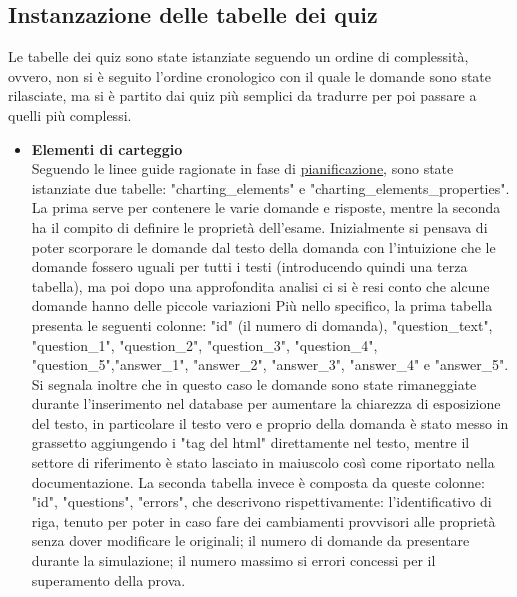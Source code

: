 \subsection{Instanzazione delle tabelle dei quiz}
Le tabelle dei quiz sono state istanziate seguendo un ordine di complessità, ovvero, non si è seguito l'ordine cronologico con il quale le domande sono state rilasciate, ma si è partito dai quiz più semplici da tradurre per poi passare a quelli più complessi.\\
\begin{itemize}
	\item \textbf{Elementi di carteggio}\\
	Seguendo le linee guide ragionate in fase di  \hyperref[cap:Introduzione]{pianificazione}, sono state istanziate due tabelle: "charting\_elements" e  "charting\_elements\_properties". La prima serve per contenere le varie domande e risposte, mentre la seconda ha il compito di definire le proprietà dell'esame. Inizialmente si pensava di poter scorporare le domande dal testo della domanda con l'intuizione che le domande fossero uguali per tutti i testi (introducendo quindi una terza tabella), ma poi dopo una approfondita analisi ci si è resi conto che alcune domande hanno delle piccole variazioni 
	Più nello specifico, la prima tabella presenta le seguenti colonne: "id" (il numero di domanda), "question\_text", "question\_1", "question\_2", "question\_3", "question\_4", "question\_5","answer\_1", "answer\_2", "answer\_3", "answer\_4" e "answer\_5". Si segnala inoltre che in questo caso le domande sono state rimaneggiate durante l'inserimento nel database per aumentare la chiarezza di esposizione del testo, in particolare il testo vero e proprio della domanda è stato messo in grassetto aggiungendo i "tag del html" direttamente nel testo, mentre il settore di riferimento è stato lasciato in maiuscolo così come riportato nella documentazione. La seconda tabella invece è composta da queste colonne: "id", "questions", "errors", che descrivono rispettivamente: l'identificativo di riga, tenuto per poter in caso fare dei cambiamenti provvisori alle proprietà senza dover modificare le originali; il numero di domande da presentare durante la simulazione; il numero massimo si errori concessi per il superamento della prova. 
	

\end{itemize}
